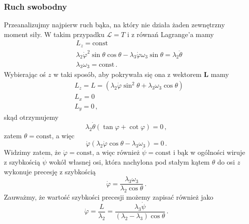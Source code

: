 \documentclass[../main.tex]{subfiles}
\begin{document}
\subsubsection*{Ruch swobodny}
Przeanalizujmy najpierw ruch bąka, na który nie działa żaden zewnętrzny moment siły. W takim przypadku \(\mathcal{L}=T\) i z równań Lagrange'a mamy
\begin{equation*}
    \begin{split}
        &L_z=\text{const}\\
        &\lambda_2\dot{\varphi}^2\sin\theta\cos\theta-\lambda_3\dot{\varphi}\omega_3\sin\theta=\lambda_2\ddot\theta\\
        &\lambda_3\omega_3=\text{const}\,.
    \end{split}
\end{equation*}
Wybierając oś \(z\) w taki sposób, aby pokrywała się ona z wektorem \(\mathbf{L}\) mamy
\begin{equation*}
\begin{split}
    &L_z=L=\left(\lambda_2\dot\varphi\sin^2\theta +\lambda_3\omega_3\cos\theta\right)\\
    &L_x=0\\
    &L_y=0\,,
\end{split}
\end{equation*}
skąd otrzymujemy
\begin{equation*}
    \lambda_2\dot\theta(\tan\varphi+\cot\varphi)=0\,,
\end{equation*}
zatem \(\theta=\text{const}\), a więc
    \begin{equation*}
        \dot\varphi(\lambda_2\dot{\varphi}\cos\theta-\lambda_3\omega_3)=0\,.
    \end{equation*}
    Widzimy zatem, że \(\dot\varphi=\text{const}\), a więc również \(\dot\psi=\text{const}\) i bąk w ogólności wiruje z szybkością \(\dot\psi\) wokół własnej osi, która nachylona pod stałym kątem \(\theta\) do osi \(z\) wykonuje precesję z szybkością
    \begin{equation*}
        \dot\varphi=\frac{\lambda_3\omega_3}{\lambda_2\cos\theta}\,.
    \end{equation*}
    Zauważmy, że wartość szybkości precesji możemy zapisać również jako
    \begin{equation*}
        \dot\varphi=\frac{L}{\lambda_2}=\frac{\lambda_3\dot\psi}{(\lambda_2-\lambda_3)\cos\theta}\,.
    \end{equation*}
\end{document}
